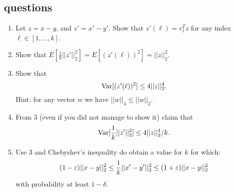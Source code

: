 \subsection*{questions}
\begin{enumerate}
\item Let $z = x-y$, and $z' = x' - y'$. Show that $z'(\ell) =
r_{\ell}^{T}z$ for any index $\ell \in [1,\ldots,k]$.

\item Show that $E[\frac{1}{k}||z'||_{2}^{2}] = E[(z'(\ell))^2] = ||z||_{2}^{2}$.
\item Show that
\[
{\operatorname{Var}}[(z'(\ell))^2] \le 4||z||_{2}^{4}.
\]
Hint: for any vector $w$ we have $||w||_4 \le ||w||_2$.
\item From 3 (even if you did not manage to show it) claim that
\[
{\operatorname{Var}}[\frac{1}{k}||z'||_{2}^{2}] \le 4||z||_{2}^{4}/k.
\]
\item Use 3 and Chebyshev's inequality do obtain a value for $k$
for which:
\[
(1-\varepsilon)||x-y||_{2}^{2} \le \frac{1}{k}||x' -y'||_{2}^{2} \le
(1+\varepsilon)||x-y||_{2}^{2}
\]
with probability at least $1-\delta$.
\end{enumerate}

\pagebreak


